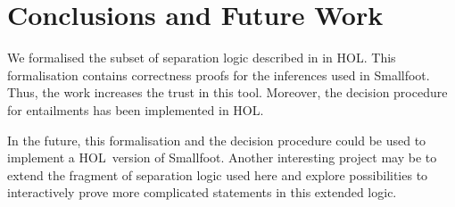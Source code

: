 \documentclass{scrartcl}
\theoremstyle{definition}
\newcommand{\smallfoot}{{\sf Smallfoot}}
\newcommand{\HOL}{{\sf HOL}}
\begin{document}
\section{Conclusions and Future Work}

We formalised the subset of separation logic described in
\cite{berdine05symbolic} in \HOL. This formalisation contains correctness
proofs for the inferences used in \smallfoot. Thus, the work increases the
trust in this tool. Moreover, the decision procedure for entailments has been
implemented in \HOL.

In the future, this formalisation and the decision procedure could be used to
implement a \HOL\ version of \smallfoot. Another interesting project may be to
extend the fragment of separation logic used here and explore possibilities to
interactively prove more complicated statements in this extended logic.


\bigskip
\bigskip


\end{document}
